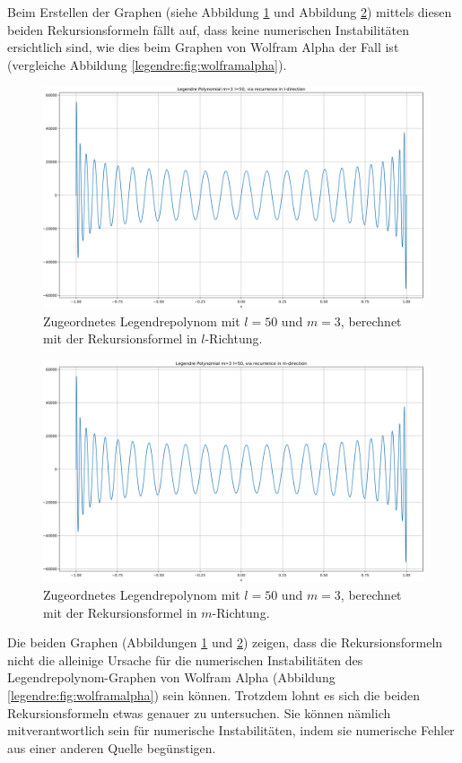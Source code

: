 Beim Erstellen der Graphen (siehe Abbildung \ref{legendre:fig:plot-l} und Abbildung \ref{legendre:fig:plot-m}) mittels diesen beiden Rekursionsformeln fällt auf, dass keine numerischen Instabilitäten ersichtlich sind, wie dies beim Graphen von Wolfram Alpha der Fall ist (vergleiche Abbildung \ref{legendre:fig:wolframalpha}).
\begin{figure}[!ht]
\centering
\includegraphics[width=1.0\linewidth]{papers/legendre/plots/plot_l_small.png}
\caption{Zugeordnetes Legendrepolynom mit \texorpdfstring{$l=50$}{l=50} und \texorpdfstring{$m=3$}{m=3}, berechnet mit der Rekursionsformel in \texorpdfstring{$l$}{l}-Richtung.}
\label{legendre:fig:plot-l}
\end{figure}
\begin{figure}[!ht]
\centering
\includegraphics[width=1.0\linewidth]{papers/legendre/plots/plot_m_small.png}
\caption{Zugeordnetes Legendrepolynom mit \texorpdfstring{$l=50$}{l=50} und \texorpdfstring{$m=3$}{m=3}, berechnet mit der Rekursionsformel in \texorpdfstring{$m$}{m}-Richtung.}
\label{legendre:fig:plot-m}
\end{figure}
Die beiden Graphen (Abbildungen \ref{legendre:fig:plot-l} und \ref{legendre:fig:plot-m}) zeigen, dass die Rekursionsformeln nicht die alleinige Ursache für die numerischen Instabilitäten des Legendrepolynom-Graphen von Wolfram Alpha (Abbildung \ref{legendre:fig:wolframalpha}) sein können.
Trotzdem lohnt es sich die beiden Rekursionsformeln etwas genauer zu untersuchen.
Sie können nämlich mitverantwortlich sein für numerische Instabilitäten, indem sie numerische Fehler aus einer anderen Quelle begünstigen.
